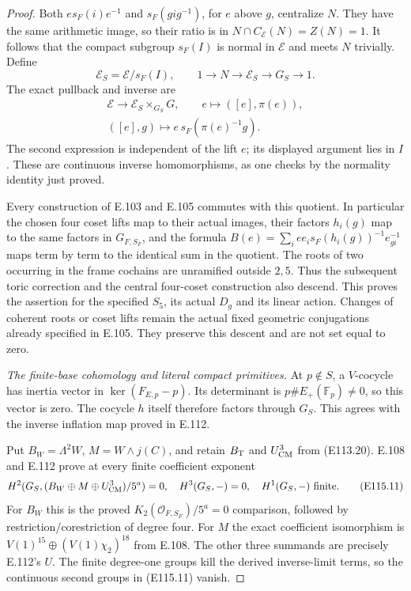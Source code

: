 \begin{proof}
Both $e s_F(i)e^{-1}$ and $s_F(gig^{-1})$, for $e$ above $g$,
centralize $N$.  They have the same arithmetic image, so their
ratio is in $N\cap C_{\mathcal E}(N)=Z(N)=1$.
It follows that the compact subgroup $s_F(I)$ is normal in
$\mathcal E$ and meets $N$ trivially.  Define
\[
 \mathcal E_S=\mathcal E/s_F(I),\qquad
 1\longrightarrow N\longrightarrow\mathcal E_S
      \longrightarrow G_S\longrightarrow1.
 \tag{E115.9}
\]
The exact pullback and inverse are
\[
 \begin{gathered}
 \mathcal E\longrightarrow\mathcal E_S\times_{G_S}G,
          \qquad e\longmapsto([e],\pi(e)),\\
 ([e],g)\longmapsto e\,s_F(\pi(e)^{-1}g).
 \end{gathered}
 \tag{E115.10}
\]
The second expression is independent of the lift $e$;
its displayed argument lies in $I$.
These are continuous inverse homomorphisms, as one checks
by the normality identity just proved.

Every construction of E.103 and E.105 commutes with this
quotient.  In particular the chosen four coset lifts map to
their actual images, their factors $h_i(g)$ map to the same
factors in $G_{F,S_F}$, and the formula
$B(e)=\sum_i e e_i s_F(h_i(g))^{-1}e_{g i}^{-1}$ maps
term by term to the identical sum in the quotient.
The roots of two occurring in the frame cochains are
unramified outside $2,5$.  Thus the subsequent toric
correction and the central four-coset construction also
descend.  This proves the assertion for the specified
$S_5$, its actual $D_g$ and its linear action.
Changes of coherent roots or coset lifts remain the actual
fixed geometric conjugations already specified in E.105.
They preserve this descent and are not set equal to zero.

\emph{The finite-base cohomology and literal compact primitives.}
At $p\notin S$, a $V$-cocycle has inertia vector in
$\ker(F_{E,p}-p)$.  Its determinant is
$p\#E_+(\mathbb F_p)\ne0$, so this vector is zero.
The cocycle $h$ itself therefore factors through $G_S$.
This agrees with the inverse inflation map proved in E.112.

Put $B_W=\Lambda^2W$, $M=W\wedge j(C)$, and retain
$B_{\rm T}$ and $U_{\rm CM}^3$ from (E113.20).
E.108 and E.112 prove at every finite coefficient exponent
\[
 H^2(G_S,(B_W\oplus M\oplus U_{\rm CM}^3)/5^a)=0,
 \quad H^3(G_S,-)=0,
 \quad H^1(G_S,-)\text{ finite}.
 \tag{E115.11}
\]
For $B_W$ this is the proved $K_2(\mathcal O_{F,S_F})/5^a=0$
comparison, followed by restriction/corestriction of degree four.
For $M$ the exact coefficient isomorphism is
$V(1)^{15}\oplus(V(1)\chi_2)^{18}$ from E.108.
The other three summands are precisely E.112's $U$.
The finite degree-one groups kill the derived inverse-limit
terms, so the continuous second groups in (E115.11) vanish.


\end{proof}
